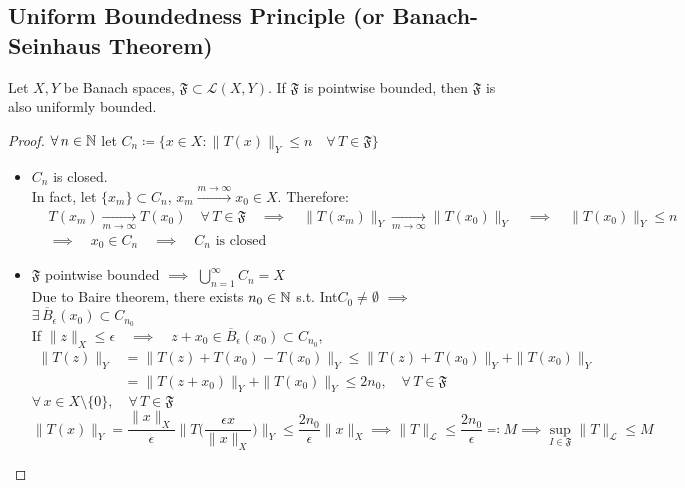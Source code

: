 \subsection{Uniform Boundedness Principle (or Banach-Seinhaus Theorem)}
Let $X,Y$ be Banach spaces, $\mathfrak{F}\subset\mathcal{L}(X,Y)$. If $\mathfrak{F}$ is pointwise bounded, then $\mathfrak{F}$ is also uniformly bounded.
\begin{proof}
    $\forall\,n\in\mathbb{N}$ let $C_n\coloneqq\{x\in X: \|T(x)\|_Y\leq n\quad\forall\,T\in\mathfrak{F}\}$
    \begin{itemize}
        \item $C_n$ is closed.\\
        In fact, let $\{x_m\}\subset C_n$, $x_m\xrightarrow{m\rightarrow\infty}x_0\in X$. Therefore: \[\begin{aligned}
            &T(x_m)\xrightarrow[m\rightarrow\infty]{}T(x_0)\quad\forall\,T\in\mathfrak{F} \quad\implies\quad \|T(x_m)\|_Y\xrightarrow[m\rightarrow\infty]{}\|T(x_0)\|_Y\quad\implies\quad\|T(x_0)\|_Y \le n\\
            &\implies\quad x_0\in C_n \quad\implies\quad C_n\mbox{ is closed}
        \end{aligned}\]
        \item $\mathfrak{F}$ pointwise bounded $\implies$ $\displaystyle\bigcup_{n=1}^\infty C_n=X$\\
        Due to Baire theorem, there exists $n_0\in\mathbb{N}$ s.t. Int$C_0\ne\emptyset$ $\implies$ $\exists\,\overline{B}_\epsilon(x_0)\subset C_{n_0}$\\
        If $\|z\|_X\leq\epsilon\quad\implies\quad z+x_0\in\overline{B}_\epsilon(x_0)\subset C_{n_0}$,
        \[\begin{aligned}
                \|T(z)\|_Y&=\|T(z)+T(x_0)-T(x_0)\|_Y\leq\|T(z)+T(x_0)\|_Y+\|T(x_0)\|_Y\\
                &=\|T(z+x_0)\|_Y+\|T(x_0)\|_Y\leq2n_0,\quad\forall\,T\in\mathfrak{F}
        \end{aligned}\]
        $\forall\,x\in X\setminus\{0\},\quad\forall\,T\in\mathfrak{F}$
         \[\|T(x)\|_Y=\frac{\|x\|_X}{\epsilon}\bigg\|T\bigg(\frac{\epsilon x}{\|x\|_X}\bigg)\bigg\|_Y\leq\frac{2n_0}{\epsilon}\|x\|_X\implies\|T\|_\mathcal{L}\leq\frac{2n_0}{\epsilon}\eqqcolon M \implies\sup_{I\in\mathfrak{F}}\|T\|_\mathcal{L}\leq M\]
    \end{itemize}
\end{proof}


